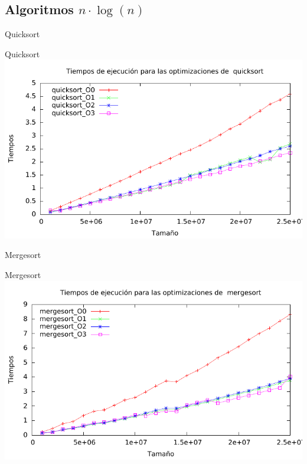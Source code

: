 \documentclass[10pt,compress,usetitleprogressbar,mathserif]{beamer}
\begin{document}
\subsection{Algoritmos $n \cdot \log(n)$}

\begin{frame}{Quicksort}
	
\end{frame}

\begin{frame}{Quicksort}
	\includegraphics[width = \textwidth ]{img/quicksort_optim_g.pdf}
\end{frame}

\begin{frame}{Mergesort}
	
\end{frame}

\begin{frame}{Mergesort}
	\includegraphics[width = \textwidth ]{img/mergesort_optim_g.pdf}
\end{frame}
\end{document}

